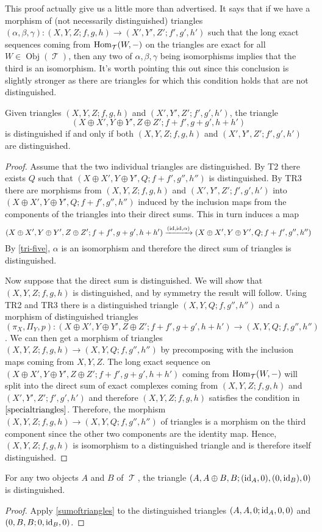 \documentclass[11pt]{article}
\DeclareMathOperator{\ob}{Obj}
\DeclareMathOperator{\TT}{\mathcal{T}}
\begin{document}
\begin{rmk}\label{specialtriangles}
This proof actually give us a little more than advertised. It says that if we have a morphism of (not necessarily distinguished) triangles $(\alpha,\beta,\gamma): (X,Y,Z; f,g,h) \to (X',Y',Z'; f',g',h')$ such that the long exact sequences coming from $\Hom_{\TT}(W,-)$ on the triangles are exact for all $W \in \ob(\TT)$, then any two of $\alpha,\beta,\gamma$ being isomorphisms implies that the third is an isomorphism. It's worth pointing this out since this conclusion is slightly stronger as there are triangles for which this condition holds that are not distinguished.
\end{rmk}

\begin{cor}\label{sumoftriangles}
	Given triangles $(X,Y,Z; f,g,h)$ and $(X',Y',Z'; f',g',h')$, the triangle
	\[
		(X \oplus X', Y \oplus Y', Z \oplus Z'; f+f', g+g', h+h')
	\]
	is distinguished if and only if both $(X,Y,Z; f,g,h)$ and $(X',Y',Z'; f',g',h')$ are distinguished.
\end{cor}
\begin{proof}
Assume that the two individual triangles are distinguished. By T2 there exists $Q$ such that $(X \oplus X', Y \oplus Y', Q; f+f', g'', h'')$ is distinguished. By TR3 there are morphisms from $(X,Y,Z; f,g,h)$ and $(X',Y',Z'; f',g',h')$ into $(X \oplus X', Y \oplus Y', Q; f+f', g'', h'')$ induced by the inclusion maps from the components of the triangles into their direct sums. This in turn induces a map 
\[
	(X \oplus X', Y \oplus Y', Z \oplus Z'; f+f', g+g', h+h') \xrightarrow{(\operatorname{id},\operatorname{id},\alpha)}(X \oplus X', Y \oplus Y', Q; f+f', g'', h'')
\]
By \autoref{tri-five}, $\alpha$ is an isomorphism and therefore the direct sum of triangles is distinguished.

Now suppose that the direct sum is distinguished. We will show that $(X,Y,Z; f,g,h)$ is distinguished, and by symmetry the result will follow. Using TR2 and TR3 there is a distinguished triangle $(X,Y,Q; f,g'',h'')$ and a morphism of distinguished triangles $(\pi_X,\Pi_Y, p): (X \oplus X', Y \oplus Y', Z \oplus Z'; f+f', g+g', h+h') \to (X,Y,Q; f,g'',h'')$. We can then get a morphism of triangles $(X,Y,Z; f,g,h) \to (X,Y,Q; f,g'',h'')$ by precomposing with the inclusion maps coming from $X,Y,Z$. The long exact sequence on $(X \oplus X', Y \oplus Y', Z \oplus Z'; f+f', g+g', h+h')$ coming from $\Hom_{\TT}(W,-)$ will split into the direct sum of exact complexes coming from $(X,Y,Z; f,g,h)$ and $(X',Y',Z'; f',g',h')$ and therefore $(X,Y,Z; f,g,h)$ satisfies the condition in $\autoref{specialtriangles}$. Therefore, the morphism $(X,Y,Z; f,g,h) \to (X,Y,Q; f,g'',h'')$ of triangles is a morphism on the third component since the other two components are the identity map. Hence, $(X,Y,Z; f,g,h)$ is isomorphism to a distinguished triangle and is therefore itself distinguished.
\end{proof}

\begin{cor}\label{tri-dir-sum}
For any two objects $A$ and $B$ of $\TT$, the triangle $(A, A \oplus B, B; (\operatorname{id}_A,0), (0,\operatorname{id}_B),0)$ is distinguished. 
\end{cor}
\begin{proof}
Apply \autoref{sumoftriangles} to the distinguished triangles $(A,A,0; \operatorname{id}_A,0,0)$ and $(0,B,B; 0,\operatorname{id}_B,0)$.
\end{proof}
\end{document}

